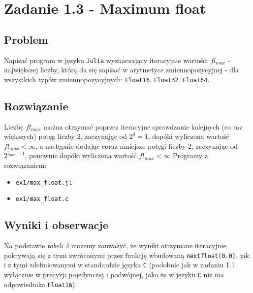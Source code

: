 \documentclass[12pt]{article}
\begin{document}
\newpage

\section*{Zadanie 1.3 - Maximum float}
    \subsection*{Problem}
    Napisać program w języku \texttt{Julia} wyznaczający iteracyjnie wartości
    $fl_{max}$ - największej liczby, którą da się zapisać w arytmetyce zmiennopozycyjnej -
    dla wszystkich typów zmiennopozycyjnych: \texttt{Float16}, \texttt{Float32}, \texttt{Float64}.

    \subsection*{Rozwiązanie}
        Liczbę $fl_{max}$ można otrzymać poprzez iteracyjne sprawdzanie kolejnych
        (co raz większych) potęg liczby $2$, zaczynając od $2^0 = 1$, dopóki wyliczona wartość $fl_{max} < \infty$,
        a następnie dodając coraz mniejsze potęgi liczby $2$, zaczynając od $2^{i_{max} - 1}$,
        ponownie dopóki wyliczona wartość $fl_{max} < \infty$
        \newline\newline
        Programy z rozwiązaniem:
        \begin{itemize}
            \item \texttt{ex1/max\_float.jl}
            \item \texttt{ex1/max\_float.c}
        \end{itemize}

    \subsection*{Wyniki i obserwacje}
        Na podstawie \textit{tabeli 5} możemy zauważyć, że wyniki otrzymane iteracyjnie pokrywają się
        z tymi zwróconymi przez funkcję wbudowaną \texttt{nextfloat(0.0)},
        jak i z tymi zdefiniowanymi w standardzie języka \texttt{C} (podobnie jak w zadaniu 1.1
        wyłącznie w precyzji pojedynczej i podwójnej, jako że w języku \texttt{C} nie ma odpowiednika \texttt{Float16}).
\end{document}
